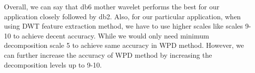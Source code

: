 \documentclass[10pt,twocolumn,letterpaper]{article}
\begin{document}
 Overall, we can say that db6 mother wavelet performs the best for our application closely followed by db2. Also, for our particular application, when using DWT feature extraction method, we have to use higher scales like scales 9-10 to achieve decent accuracy. While we would only need minimum decomposition scale 5 to achieve same accuracy in WPD method. However, we can further increase the accuracy of WPD method by increasing the decomposition levels up to 9-10.

\begin{table}[htbp]
\caption{SVM - Classification Accuracy : DWT vs WPD}
\label{tab:caption}
\end{table}

\end{document}
